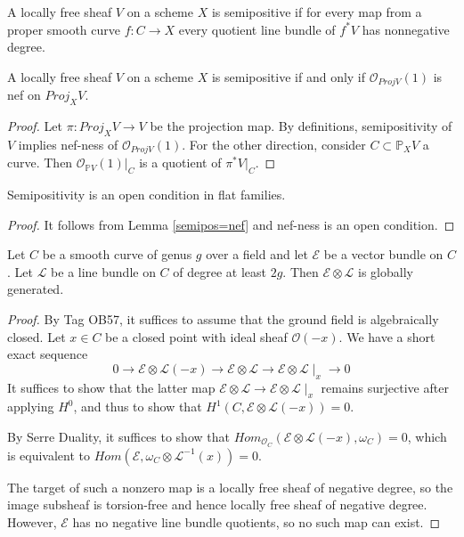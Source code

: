 \begin{definition}
A locally free sheaf $V$ on a scheme $X$ is semipositive if for every map from a proper smooth curve $f:C\to X$ every quotient line bundle of $f^*V$ has nonnegative degree.
\end{definition}

\begin{lemma}\label{semipos=nef}
A locally free sheaf $V$ on a scheme $X$ is semipositive if and only if $\mathcal{O}_{Proj V}(1)$ is nef on $Proj_XV$.
\end{lemma}
\begin{proof}
Let $\pi: Proj_X V\to V$ be the projection map. By definitions, semipositivity of $V$ implies nef-ness of $\mathcal{O}_{Proj V}(1)$. For the other direction, consider $C\subset \mathbb{P}_XV$ a curve. Then $\mathcal{O}_{\mathbb{P}V}(1)|_C$ is a quotient of $\pi^*V|_C$. 
\end{proof}

\begin{lemma}
Semipositivity is an open condition in flat families.
\end{lemma}

\begin{proof}
It follows from Lemma \ref{semipos=nef} and nef-ness is an open condition.
\end{proof}

\begin{lemma}\label{global_generation_of_twist_on_curve}
Let $C$ be a smooth curve of genus $g$ over a field and let $\mathcal{E}$ be a vector bundle on $C$. 
Let $\mathcal{L}$ be a line bundle on $C$ of degree at least $2g$. 
Then $\mathcal{E}\otimes\mathcal{L}$ is globally generated.
\end{lemma}

\begin{proof}
By Tag OB57, it suffices to assume that the ground field is algebraically closed. 
Let $x\in C$ be a closed point with ideal sheaf $\mathcal{O}(-x)$. 
We have a short exact sequence
\begin{equation}
0\to\mathcal{E}\otimes\mathcal{L}(-x)\to\mathcal{E}\otimes\mathcal{L}\to\mathcal{E}\otimes\mathcal{L}\mid_x\to0
\end{equation}
It suffices to show that the latter map $\mathcal{E}\otimes\mathcal{L}\to\mathcal{E}\otimes\mathcal{L}\mid_x$ remains surjective after applying $H^0$, and thus to show that $H^1(C,\mathcal{E}\otimes\mathcal{L}(-x))=0$.

By Serre Duality, it suffices to show that $Hom_{\mathcal{O}_C}(\mathcal{E}\otimes\mathcal{L}(-x),\omega_C)=0$, which is equivalent to $Hom(\mathcal{E},\omega_C\otimes\mathcal{L}^{-1}(x))=0$.

The target of such a nonzero map is a locally free sheaf of negative degree, so the image subsheaf is torsion-free and hence locally free sheaf of negative degree. However, $\mathcal{E}$ has no negative line bundle quotients, so no such map can exist.
\end{proof}



